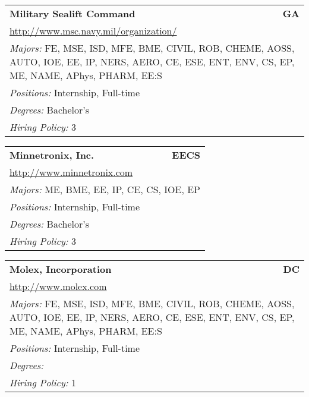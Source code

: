 \documentclass[twoside]{article}
\begin{document}
\begin{center}
\begin{multicols}{3}
\begin{FlushLeft}
\begin{minipage}{\columnwidth}\begin{tabularx}{.95\columnwidth}{Xr}
                 {\Large\bf Military Sealift Command} & {\Large\bf GA}\\
    \multicolumn{2}{p{.95\columnwidth}}{\url{http://www.msc.navy.mil/organization/}}\\
    \multicolumn{2}{p{.95\columnwidth}}{\emph{Majors:} FE, MSE, ISD, MFE, BME, CIVIL, ROB, CHEME, AOSS, AUTO, IOE, EE, IP, NERS, AERO, CE, ESE, ENT, ENV, CS, EP, ME, NAME, APhys, PHARM, EE:S}\\
    \multicolumn{2}{p{.95\columnwidth}}{\emph{Positions:} Internship, Full-time}\\
    \multicolumn{2}{p{.95\columnwidth}}{\emph{Degrees:} Bachelor's}\\
    \multicolumn{2}{p{.95\columnwidth}}{\emph{Hiring Policy:} 3}\\
    \end{tabularx}
    
\end{minipage}
 
\begin{minipage}{\columnwidth}\begin{tabularx}{.95\columnwidth}{Xr}
                 {\Large\bf Minnetronix, Inc.} & {\Large\bf EECS}\\
    \multicolumn{2}{p{.95\columnwidth}}{\url{http://www.minnetronix.com}}\\
    \multicolumn{2}{p{.95\columnwidth}}{\emph{Majors:} ME, BME, EE, IP, CE, CS, IOE, EP}\\
    \multicolumn{2}{p{.95\columnwidth}}{\emph{Positions:} Internship, Full-time}\\
    \multicolumn{2}{p{.95\columnwidth}}{\emph{Degrees:} Bachelor's}\\
    \multicolumn{2}{p{.95\columnwidth}}{\emph{Hiring Policy:} 3}\\
    \end{tabularx}
    
\end{minipage}
 
\begin{minipage}{\columnwidth}\begin{tabularx}{.95\columnwidth}{Xr}
                 {\Large\bf Molex, Incorporation} & {\Large\bf DC}\\
    \multicolumn{2}{p{.95\columnwidth}}{\url{http://www.molex.com}}\\
    \multicolumn{2}{p{.95\columnwidth}}{\emph{Majors:} FE, MSE, ISD, MFE, BME, CIVIL, ROB, CHEME, AOSS, AUTO, IOE, EE, IP, NERS, AERO, CE, ESE, ENT, ENV, CS, EP, ME, NAME, APhys, PHARM, EE:S}\\
    \multicolumn{2}{p{.95\columnwidth}}{\emph{Positions:} Internship, Full-time}\\
    \multicolumn{2}{p{.95\columnwidth}}{\emph{Degrees:} }\\
    \multicolumn{2}{p{.95\columnwidth}}{\emph{Hiring Policy:} 1}\\
    \end{tabularx}
    

\end{minipage}
\end{FlushLeft}
\end{multicols}
\end{center}
\end{document}
